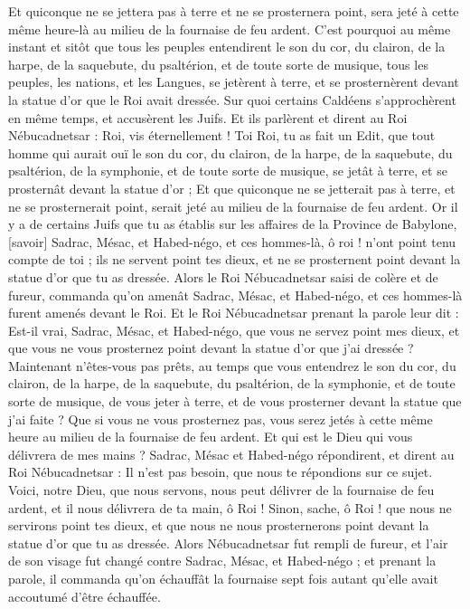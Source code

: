\begin{multicols}{2}
Et quiconque ne se jettera pas à terre et ne se prosternera point, sera jeté à cette même heure-là au milieu de la fournaise de feu ardent.
C'est pourquoi au même instant et sitôt que tous les peuples entendirent le son du cor, du clairon, de la harpe, de la saquebute, du psaltérion, et de toute sorte de musique, tous les peuples, les nations, et les Langues, se jetèrent à terre, et se prosternèrent devant la statue d'or que le Roi avait dressée.
Sur quoi certains Caldéens s'approchèrent en même temps, et accusèrent les Juifs.
Et ils parlèrent et dirent au Roi Nébucadnetsar : Roi, vis éternellement !
Toi Roi, tu as fait un Edit, que tout homme qui aurait ouï le son du cor, du clairon, de la harpe, de la saquebute, du psaltérion, de la symphonie, et de toute sorte de musique, se jetât à terre, et se prosternât devant la statue d'or ;
Et que quiconque ne se jetterait pas à terre, et ne se prosternerait point, serait jeté au milieu de la fournaise de feu ardent.
Or il y a de certains Juifs que tu as établis sur les affaires de la Province de Babylone, [savoir] Sadrac, Mésac, et Habed-négo, et ces hommes-là, ô roi ! n'ont point tenu compte de toi ; ils ne servent point tes dieux, et ne se prosternent point devant la statue d'or que tu as dressée.
Alors le Roi Nébucadnetsar saisi de colère et de fureur, commanda qu'on amenât Sadrac, Mésac, et Habed-négo, et ces hommes-là furent amenés devant le Roi.
Et le Roi Nébucadnetsar prenant la parole leur dit : Est-il vrai, Sadrac, Mésac, et Habed-négo, que vous ne servez point mes dieux, et que vous ne vous prosternez point devant la statue d'or que j'ai dressée ?
Maintenant n'êtes-vous pas prêts, au temps que vous entendrez le son du cor, du clairon, de la harpe, de la saquebute, du psaltérion, de la symphonie, et de toute sorte de musique, de vous jeter à terre, et de vous prosterner devant la statue que j'ai faite ? Que si vous ne vous prosternez pas, vous serez jetés à cette même heure au milieu de la fournaise de feu ardent. Et qui est le Dieu qui vous délivrera de mes mains ?
Sadrac, Mésac et Habed-négo répondirent, et dirent au Roi Nébucadnetsar : Il n'est pas besoin, que nous te répondions sur ce sujet.
Voici, notre Dieu, que nous servons, nous peut délivrer de la fournaise de feu ardent, et il nous délivrera de ta main, ô Roi !
Sinon, sache, ô Roi ! que nous ne servirons point tes dieux, et que nous ne nous prosternerons point devant la statue d'or que tu as dressée.
Alors Nébucadnetsar fut rempli de fureur, et l'air de son visage fut changé contre Sadrac, Mésac, et Habed-négo ; et prenant la parole, il commanda qu'on échauffât la fournaise sept fois autant qu'elle avait accoutumé d'être échauffée.

\end{multicols}
